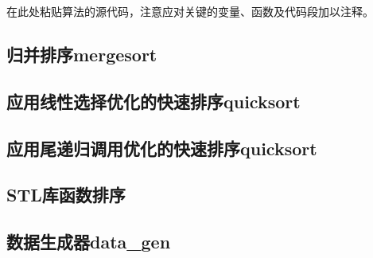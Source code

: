 在此处粘贴算法的源代码，注意应对关键的变量、函数及代码段加以注释。
\subsection{归并排序mergesort}

\subsection{应用线性选择优化的快速排序quicksort}

\subsection{应用尾递归调用优化的快速排序quicksort}

\subsection{STL库函数排序}

\subsection{数据生成器data\_gen}


